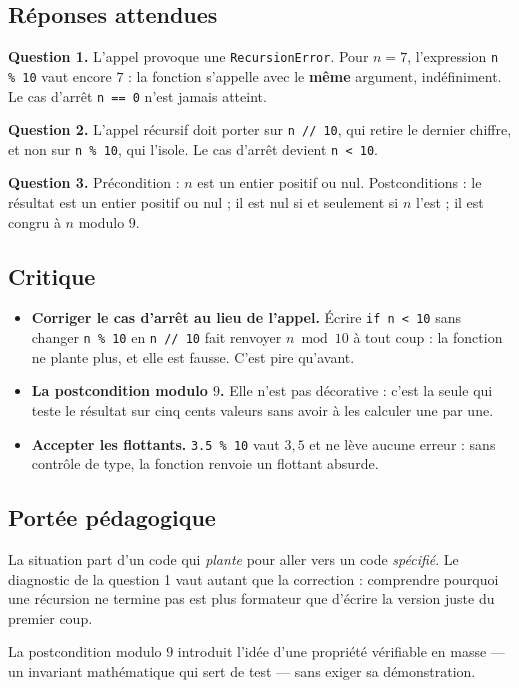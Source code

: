 \subsection*{Réponses attendues}

\textbf{Question 1.} L'appel provoque une \lstinline{RecursionError}. Pour
$n = 7$, l'expression \lstinline{n % 10} vaut encore $7$ : la fonction
s'appelle avec le \textbf{même} argument, indéfiniment. Le cas d'arrêt
\lstinline{n == 0} n'est jamais atteint.

\medskip
\textbf{Question 2.} L'appel récursif doit porter sur \lstinline{n // 10}, qui
retire le dernier chiffre, et non sur \lstinline{n % 10}, qui l'isole. Le cas
d'arrêt devient \lstinline{n < 10}.

\medskip
\textbf{Question 3.} Précondition : $n$ est un entier positif ou nul.
Postconditions : le résultat est un entier positif ou nul ; il est nul si et
seulement si $n$ l'est ; il est congru à $n$ modulo $9$.

\subsection*{Critique}

\begin{itemize}
  \item \textbf{Corriger le cas d'arrêt au lieu de l'appel.} Écrire
    \lstinline{if n < 10} sans changer \lstinline{n % 10} en
    \lstinline{n // 10} fait renvoyer $n \bmod 10$ à tout coup : la fonction ne
    plante plus, et elle est fausse. C'est pire qu'avant.
  \item \textbf{La postcondition modulo $9$.} Elle n'est pas décorative : c'est
    la seule qui teste le résultat sur cinq cents valeurs sans avoir à les
    calculer une par une.
  \item \textbf{Accepter les flottants.} \lstinline{3.5 % 10} vaut $3{,}5$ et ne
    lève aucune erreur : sans contrôle de type, la fonction renvoie un flottant
    absurde.
\end{itemize}

\subsection*{Portée pédagogique}

La situation part d'un code qui \emph{plante} pour aller vers un code
\emph{spécifié}. Le diagnostic de la question 1 vaut autant que la correction :
comprendre pourquoi une récursion ne termine pas est plus formateur que
d'écrire la version juste du premier coup.

La postcondition modulo $9$ introduit l'idée d'une propriété vérifiable en
masse — un invariant mathématique qui sert de test — sans exiger sa
démonstration.
